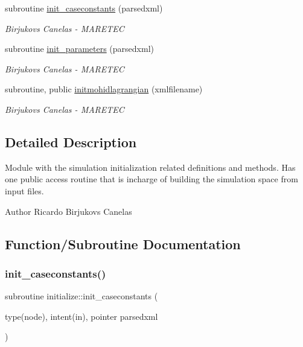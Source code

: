 \begin{DoxyCompactItemize}
subroutine \mbox{\hyperlink{namespaceinitialize_a00eae5cde006bc91bc7a03e640e6ee83}{init\+\_\+caseconstants}} (parsedxml)
\begin{DoxyCompactList}\small\item\em Birjukovs Canelas -\/ M\+A\+R\+E\+T\+EC \end{DoxyCompactList}\item 
subroutine \mbox{\hyperlink{namespaceinitialize_a0de593b39b1b0389d225f93de17dc15d}{init\+\_\+parameters}} (parsedxml)
\begin{DoxyCompactList}\small\item\em Birjukovs Canelas -\/ M\+A\+R\+E\+T\+EC \end{DoxyCompactList}\item 
subroutine, public \mbox{\hyperlink{namespaceinitialize_a45b7ca20c45cf272acbc391950cbb804}{initmohidlagrangian}} (xmlfilename)
\begin{DoxyCompactList}\small\item\em Birjukovs Canelas -\/ M\+A\+R\+E\+T\+EC \end{DoxyCompactList}\end{DoxyCompactItemize}


\subsection{Detailed Description}
Module with the simulation initialization related definitions and methods. Has one public access routine that is incharge of building the simulation space from input files. 

\begin{DoxyAuthor}{Author}
Ricardo Birjukovs Canelas 
\end{DoxyAuthor}


\subsection{Function/\+Subroutine Documentation}
\mbox{\label{namespaceinitialize_a00eae5cde006bc91bc7a03e640e6ee83}} 
\subsubsection{\texorpdfstring{init\+\_\+caseconstants()}{init\_caseconstants()}}
{\footnotesize\ttfamily subroutine initialize\+::init\+\_\+caseconstants (\begin{DoxyParamCaption}\item[{type(node), intent(in), pointer}]{parsedxml }\end{DoxyParamCaption})\hspace{0.3cm}{\ttfamily [private]}}



